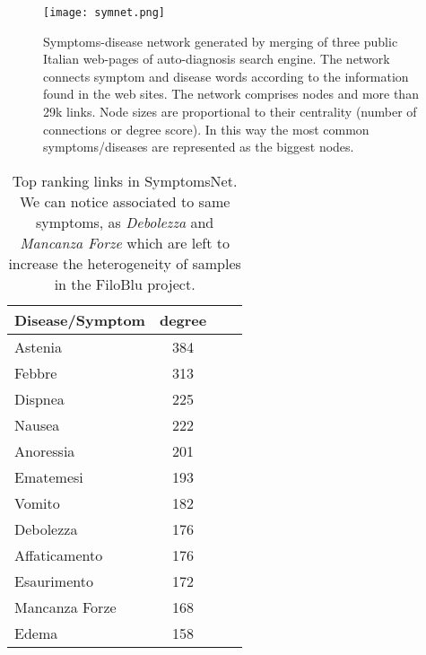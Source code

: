 \documentclass{standalone}
\begin{document}
\begin{figure}[htbp]
\centering
\texttt{[image: symnet.png]}
\caption{Symptoms-disease network generated by merging of three public Italian web-pages of auto-diagnosis search engine.
The network connects symptom and disease words according to the information found in the web sites.
The network comprises  nodes and more than 29k links.
Node sizes are proportional to their centrality (number of connections or degree score).
In this way the most common symptoms/diseases are represented as the biggest nodes.
}
\label{fig:net}
\end{figure}

\begin{table}[htbp]
\centering
\begin{tabular}{lccc}
\hline \rowcolor{darkgrayrow}
Disease/Symptom & degree \\
\hline
Astenia         & 384    \\
Febbre          & 313    \\
Dispnea         & 225    \\
Nausea          & 222    \\
Anoressia       & 201    \\
Ematemesi       & 193    \\
Vomito          & 182    \\
Debolezza       & 176    \\
Affaticamento   & 176    \\
Esaurimento     & 172    \\
Mancanza Forze  & 168    \\
Edema           & 158    \\
\hline
\end{tabular}
\caption{Top ranking links in \textsf{SymptomsNet}.
We can notice  associated to same symptoms, as \emph{Debolezza} and \emph{Mancanza Forze} which are left to increase the heterogeneity of samples in the FiloBlu project.}
\label{tab:rank}
\end{table}
\end{document}
